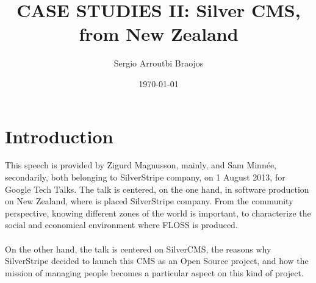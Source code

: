 \documentclass[11pt]{article}
\title{\textbf{CASE STUDIES II: Silver CMS, from New Zealand}}
\author{Sergio Arroutbi Braojos}
\date{\today}
\begin{document}
\maketitle

\section{Introduction}
This speech is provided by Zigurd Magnusson, mainly, and Sam Minnée, secondarily, both belonging to SilverStripe company, on 1 August 2013, for Google Tech Talks. The talk is centered, on the one hand, in software production on New Zealand, where is placed SilverStripe company. From the community perspective, knowing different zones of the world is important, to characterize the social and economical environment where FLOSS is produced.\\
\\
On the other hand, the talk is centered on SilverCMS, the reasons why SilverStripe decided to launch this CMS as an Open Source project, and how the mission of managing people becomes a particular aspect on this kind of project.
\end{document}

